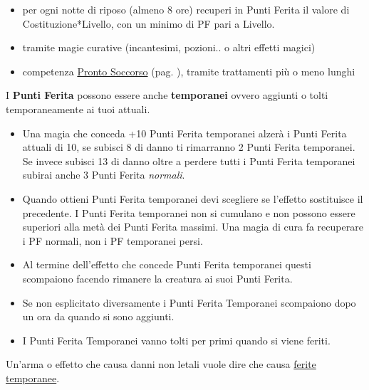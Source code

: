 \begin{itemize}[leftmargin=*] \setlength{\itemsep}{0pt}

\item per ogni notte di riposo (almeno 8 ore) recuperi in Punti Ferita il valore di Costituzione*Livello, con un minimo di PF pari a Livello. 

\item tramite magie curative (incantesimi, pozioni.. o altri effetti magici)

\item competenza \hyperlink{prontosoccorso}{Pronto Soccorso} (pag. \pageref{prontosoccorso}), tramite trattamenti più o meno lunghi

\end{itemize}

I \textbf{Punti Ferita} possono essere anche \textbf{temporanei} ovvero aggiunti o tolti temporaneamente ai tuoi attuali.

\noindent\begin{itemize}[leftmargin=*] \setlength{\itemsep}{0pt}

\item Una magia che conceda +10 Punti Ferita temporanei alzerà i Punti Ferita attuali di 10, se subisci 8 di danno ti rimarranno 2 Punti Ferita temporanei. Se invece subisci 13 di danno oltre a perdere tutti i Punti Ferita temporanei subirai anche 3 Punti Ferita \emph{normali}.

\item Quando ottieni Punti Ferita temporanei devi scegliere se l'effetto sostituisce il precedente. I Punti Ferita temporanei non si cumulano e non possono essere superiori alla metà dei Punti Ferita massimi. Una magia di cura fa recuperare i PF normali, non i PF temporanei persi.

\item Al termine dell'effetto che concede Punti Ferita temporanei questi scompaiono facendo rimanere la creatura ai suoi Punti Ferita.

\item Se non esplicitato diversamente i Punti Ferita Temporanei scompaiono dopo un ora da quando si sono aggiunti.

\item I Punti Ferita Temporanei vanno tolti per primi quando si viene feriti.

\end{itemize}

Un'arma o effetto che causa danni non letali vuole dire che causa \hyperlink{recuperopuntiferitanonletali}{ferite temporanee}\label{feritetemporanee}.

